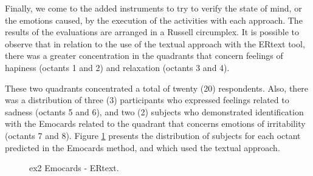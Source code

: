 Finally, we come to the added instruments to try to verify the state of mind, or the emotions caused, by the execution of the activities with each approach.
The results of the evaluations are arranged in a Russell circumplex.
It is possible to observe that in relation to the use of the textual approach with the ERtext tool, there was a greater concentration in the quadrants that concern feelings of hapiness (octants 1 and 2) and relaxation (octants 3 and 4).

These two quadrants concentrated a total of twenty (20) respondents.
Also, there was a distribution of three (3) participants who expressed feelings related to sadness (octants 5 and 6), and two (2) subjects who demonstrated identification with the Emocards related to the quadrant that concerns emotions of irritability (octants 7 and 8).
Figure \ref{fig:Emocards1_alt} presents the distribution of subjects for each octant predicted in the Emocards method, and which used the textual approach.

\begin{figure}[!htb]
    \centering
    \caption{\ac{ex2} Emocards - ERtext.}
    \label{fig:Emocards1_alt}
    
\end{figure}

